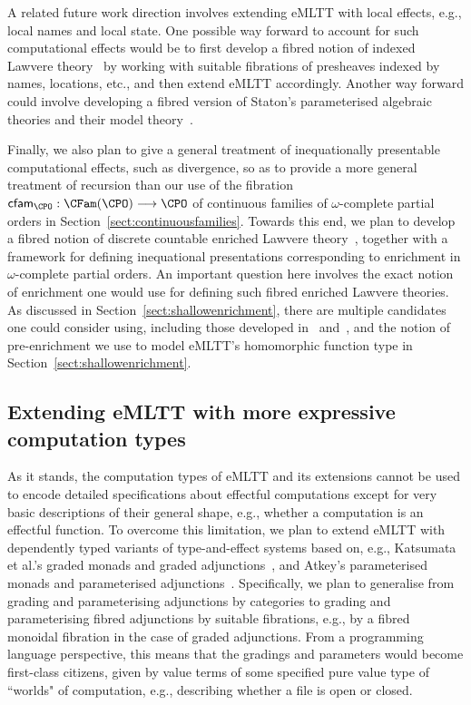 A related future work direction involves extending eMLTT with local effects, e.g., local names and local state. One possible way forward to account for such computational effects would be to first develop a fibred notion of indexed Lawvere theory~\cite{Power:IndexedLawvereTheories} by working with suitable fibrations of presheaves indexed by names, locations, etc., and then extend eMLTT accordingly. Another way forward could involve developing a fibred version of Staton's parameterised algebraic theories and  their model theory~\cite{Staton:Instances}.

Finally, we also plan to give a general treatment of inequationally presentable computational effects, such as divergence, so as to provide a more general treatment of recursion than our use of the fibration $\mathsf{cfam}_{\CPO} : \CFam(\CPO) \longrightarrow \CPO$ of continuous families of $\omega$-complete partial orders in Section~\ref{sect:continuousfamilies}. Towards this end, we plan to develop a fibred notion of discrete countable enriched Lawvere theory~\cite{Hyland:DiscreteLawTh}, together with a framework for defining inequational presentations corresponding to enrichment in $\omega$-complete partial orders. An important question here involves the exact notion of enrichment one would use for defining such fibred enriched Lawvere theories. As discussed in Section~\ref{sect:shallowenrichment}, there are multiple candidates one could consider using, including those developed in~\cite{Shulman:EnrichedIndexedCategories} and~\cite[Section~8.1]{Vasilakopoulou:Thesis}, and the notion of pre-enrichment we use to model eMLTT's homomorphic function type in Section~\ref{sect:shallowenrichment}.

\subsection{Extending eMLTT with more expressive computation types}
\label{sect:fibredparametrisedeffects}

As it stands, the computation types of eMLTT and its extensions cannot be used to encode detailed specifications about effectful computations except for very basic descriptions of their general shape, e.g., whether a computation is an effectful function.  
To overcome this limitation, we plan to extend eMLTT with dependently typed variants of type-and-effect systems based on, e.g., Katsumata et al.'s graded monads and graded adjunctions~\cite{Katsumata:EffectMonads,Fujii:GradedMonads}, and Atkey's parameterised monads and parameterised adjunctions~\cite{Atkey:ParametrizedNotions,Atkey:Algebras}. 
Specifically, we plan to generalise from grading and parameterising adjunctions by categories to grading and parameterising fibred adjunctions by suitable fibrations, e.g., by a fibred monoidal fibration in the case of graded adjunctions. From a programming language perspective, this means that the gradings and parameters would become first-class citizens, given by value terms of some specified pure value type of ``worlds" of computation, e.g., describing whether a file is open or closed. 
%

